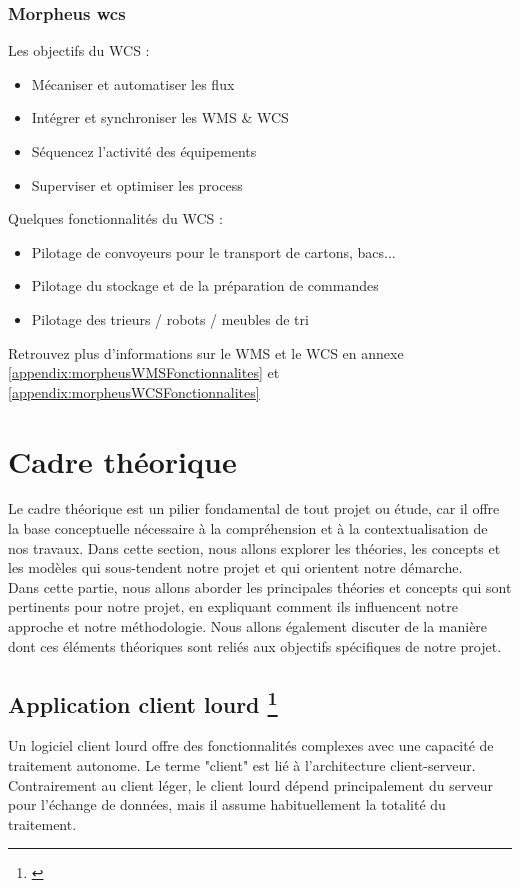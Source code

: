 \documentclass[a4paper, 12pt, french]{article}
\newcommand{\bdot}{\item[\color{ssiYellow}\ding{108}]}
\begin{document}
			\subsubsection{Morpheus \acrshort{wcs}}
				\noindent
				Les objectifs du WCS :
				\begin{itemize}
					\bdot{Mécaniser et automatiser les flux}
					\bdot{Intégrer et synchroniser les WMS \& WCS}
					\bdot{Séquencez l'activité des équipements}
					\bdot{Superviser et optimiser les process}
				\end{itemize}
				\vspace{\baselineskip}
				Quelques fonctionnalités du WCS :
				\begin{itemize}
					\bdot{Pilotage de convoyeurs pour le transport de cartons, bacs...}
					\bdot{Pilotage du stockage et de la préparation de commandes}
					\bdot{Pilotage des trieurs / robots / meubles de tri}
				\end{itemize}
				\vspace{\baselineskip}
				Retrouvez plus d'informations sur le WMS et le WCS en annexe \ref{appendix:morpheusWMSFonctionnalites} et \ref{appendix:morpheusWCSFonctionnalites}

	\newpage

	\section{Cadre théorique}
		Le cadre théorique est un pilier fondamental de tout projet ou étude, car il offre la base conceptuelle nécessaire à la compréhension et à la contextualisation de nos travaux. Dans cette section, nous allons explorer les théories, les concepts et les modèles qui sous-tendent notre projet et qui orientent notre démarche.\\

		Dans cette partie, nous allons aborder les principales théories et concepts qui sont pertinents pour notre projet, en expliquant comment ils influencent notre approche et notre méthodologie. Nous allons également discuter de la manière dont ces éléments théoriques sont reliés aux objectifs spécifiques de notre projet.
	
		\subsection{Application client lourd \footnote{\cite{wikipediaClientLourd}}}%
			Un logiciel client lourd offre des fonctionnalités complexes avec une capacité de traitement autonome. Le terme "client" est lié à l'architecture client-serveur. Contrairement au client léger, le client lourd dépend principalement du serveur pour l'échange de données, mais il assume habituellement la totalité du traitement.
			
\end{document}
